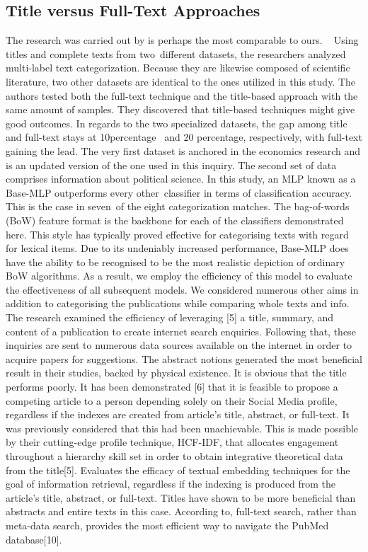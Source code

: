 \documentclass[a4paper]{article}
\begin{document}
\subsection{Title versus Full-Text Approaches}
The research was carried out by \cite{bib7} is perhaps the most comparable to ours.   Using titles and complete texts from two different datasets, the researchers analyzed multi-label text categorization. Because they are likewise composed of scientific literature, two other datasets are identical to the ones utilized in this study. The authors tested both the full-text technique and the title-based approach with the same amount of samples. They discovered that title-based techniques might give good outcomes. In regards to the two specialized datasets, the gap among title and full-text stays at 10percentage  and 20 percentage, respectively, with full-text gaining the lead. The very first dataset is anchored in the economics research and is an updated version of the one used in this inquiry. The second set of data comprises information about political science. In this study, an MLP known as a Base-MLP outperforms every other classifier in terms of classification accuracy. This is the case in seven of the eight categorization matches. The bag-of-words (BoW) feature format is the backbone for each of the classifiers demonstrated here. This style has typically proved effective for categorising texts with regard for lexical items. Due to its undeniably increased performance, Base-MLP does have the ability to be recognised to be the most realistic depiction of ordinary BoW algorithms. As a result, we employ the efficiency of this model to evaluate the effectiveness of all subsequent models. We considered numerous other aims in addition to categorising the publications while comparing whole texts and info. The research examined the efficiency of leveraging [5] a title, summary, and content of a publication to create internet search enquiries. Following that, these inquiries are sent to numerous data sources available on the internet in order to acquire papers for suggestions. The abstract notions generated the most beneficial result in their studies, backed by physical existence. It is obvious that the title performs poorly. It has been demonstrated [6] that it is feasible to propose a competing article to a person depending solely on their Social Media profile, regardless if the indexes are created from article's title, abstract, or full-text. It was previously considered that this had been unachievable. This is made possible by their cutting-edge profile technique, HCF-IDF, that allocates engagement throughout a hierarchy skill set in order to obtain integrative theoretical data from the title[5]. Evaluates the efficacy of textual embedding techniques for the goal of information retrieval, regardless if the indexing is produced from the article's title, abstract, or full-text. Titles have shown to be more beneficial than abstracts and entire texts in this case. According to, full-text search, rather than meta-data search, provides the most efficient way to navigate the PubMed database[10].
\end{document}
